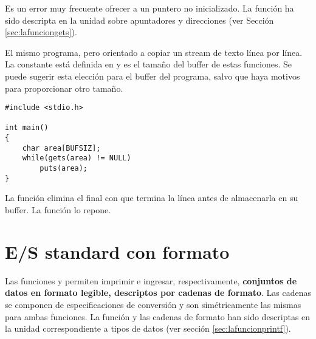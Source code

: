 Es un error muy frecuente ofrecer a  un puntero
no inicializado. La función  ha sido descripta en la unidad sobre
apuntadores y direcciones (ver Sección \ref{sec:lafunciongets}).


\begin{ejemplo}
El mismo programa, pero orientado a copiar un stream de texto línea por línea.
La constante  está definida en  y es el tamaño del buffer de estas
funciones. Se puede sugerir esta elección para el buffer del programa, salvo
que haya motivos para proporcionar otro tamaño.

\begin{lstlisting}
#include <stdio.h>

int main()
{
    char area[BUFSIZ];
    while(gets(area) != NULL)
        puts(area);
}
\end{lstlisting}
\end{ejemplo}

La función  elimina el \code{\\n} final con que termina la línea antes de
almacenarla en su buffer. La función  lo repone.


\section{E/S standard con formato}
\label{subsec:esstandardformato}
Las funciones  y  permiten imprimir e ingresar, respectivamente,
\textbf{conjuntos de datos en formato legible, descriptos por cadenas de formato}. Las
cadenas se componen de especificaciones de conversión y son simétricamente las
mismas para ambas funciones. La función  y las cadenas de formato han
sido descriptas en la unidad correspondiente a tipos de datos (ver sección \ref{sec:lafuncionprintf}).

